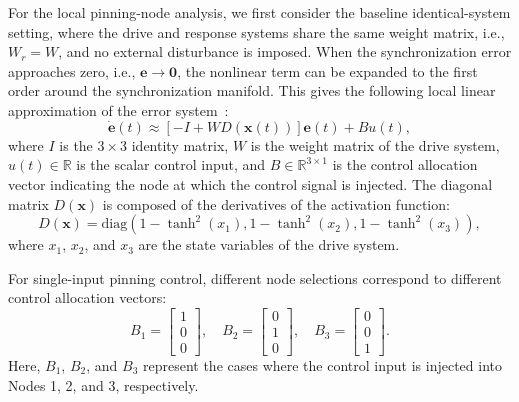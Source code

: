 \documentclass[a4paper,fleqn]{cas-sc}
\theoremstyle{plain}
\theoremstyle{definition}
\begin{document}
For the local pinning-node analysis, we first consider the baseline identical-system setting, where the drive and response systems share the same weight matrix, i.e., $W_r=W$, and no external disturbance is imposed. When the synchronization error approaches zero, i.e., $\mathbf{e}\to \mathbf{0}$, the nonlinear term can be expanded to the first order around the synchronization manifold. This gives the following local linear approximation of the error system~\cite{slotine1991applied}:
\begin{equation}
	\dot{\mathbf{e}}(t)
	\approx
	\left[-I+WD(\mathbf{x}(t))\right]\mathbf{e}(t)
	+
	Bu(t),
	\label{eq:local_linear_error}
\end{equation}
where $I$ is the $3\times 3$ identity matrix, $W$ is the weight matrix of the drive system, $u(t)\in\mathbb{R}$ is the scalar control input, and $B\in\mathbb{R}^{3\times 1}$ is the control allocation vector indicating the node at which the control signal is injected. The diagonal matrix $D(\mathbf{x})$ is composed of the derivatives of the activation function:
\begin{equation}
	D(\mathbf{x})
	=
	\mathrm{diag}
	\left(
	1-\tanh^2(x_1),
	1-\tanh^2(x_2),
	1-\tanh^2(x_3)
	\right),
	\label{eq:D_matrix}
\end{equation}
where $x_1$, $x_2$, and $x_3$ are the state variables of the drive system.

For single-input pinning control, different node selections correspond to different control allocation vectors:
\begin{equation}
	B_1=
	\begin{bmatrix}
		1\\0\\0
	\end{bmatrix},
	\quad
	B_2=
	\begin{bmatrix}
		0\\1\\0
	\end{bmatrix},
	\quad
	B_3=
	\begin{bmatrix}
		0\\0\\1
	\end{bmatrix}.
	\label{eq:pinning_vectors}
\end{equation}
Here, $B_1$, $B_2$, and $B_3$ represent the cases where the control input is injected into Nodes 1, 2, and 3, respectively.
\end{document}
